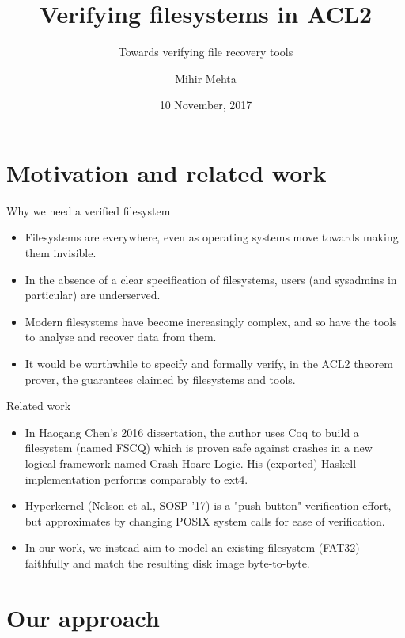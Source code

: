 \documentclass{beamer}
\title{Verifying filesystems in ACL2}
\subtitle{Towards verifying file recovery tools}
\author{Mihir Mehta}
\institute{
  Department of Computer Science\\
  University of Texas at Austin\\[1ex]
  \texttt{mihir@cs.utexas.edu}
}
\date{10 November, 2017}
\begin{document}
\begin{frame}[plain]
  \titlepage
\end{frame}


\section{Motivation and related work}

\begin{frame}{Why we need a verified filesystem}
  \begin{itemize}
  \item Filesystems are everywhere, even as operating systems move
    towards making them invisible.
  \item In the absence of a clear specification of filesystems, users
    (and sysadmins in particular) are underserved.
  \item Modern filesystems have become increasingly complex, and so
    have the tools to analyse and recover data from them.
  \item It would be worthwhile to specify and formally verify, in the
    ACL2 theorem prover, the guarantees claimed by filesystems and tools.
  \end{itemize}
\end{frame}

\begin{frame}{Related work}
  \begin{itemize}
  \item In Haogang Chen's 2016 dissertation, the author uses Coq to
    build a filesystem (named FSCQ) which is proven safe against
    crashes in a new logical framework named Crash Hoare Logic. His
    (exported) Haskell implementation performs comparably to ext4.
  \item Hyperkernel (Nelson et al., SOSP '17) is a "push-button"
    verification effort, but approximates by changing POSIX system
    calls for ease of verification.
  \item In our work, we instead aim to model an existing filesystem (FAT32)
    faithfully and match the resulting disk image byte-to-byte.
  \end{itemize}
\end{frame}

\section{Our approach}
\end{document}

